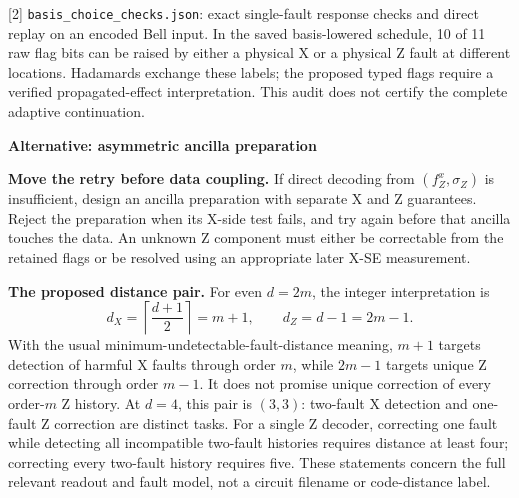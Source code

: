 \documentclass[11pt,a4paper]{article}
\begin{document}
{\footnotesize
[2] \texttt{basis\_choice\_checks.json}: exact single-fault response checks
and direct replay on an encoded Bell input. In the saved basis-lowered
schedule, 10 of 11 raw flag bits can be raised by either a physical X or a
physical Z fault at different locations. Hadamards exchange these labels;
the proposed typed flags require a verified propagated-effect interpretation.
This audit does not certify the complete adaptive continuation.
}

\clearpage
{\LARGE\bfseries Alternative: asymmetric ancilla preparation}\par

\textbf{Move the retry before data coupling.}
If direct decoding from $(f_Z^x,\sigma_Z)$ is insufficient, design an ancilla
preparation with separate X and Z guarantees. Reject the preparation when
its X-side test fails, and try again before that ancilla touches the data.
An unknown Z component must either be correctable from the retained flags
or be resolved using an appropriate later X-SE measurement.

\begin{center}
\end{center}

\textbf{The proposed distance pair.}
For even $d=2m$, the integer interpretation is
\[
 d_X=\left\lceil\frac{d+1}{2}\right\rceil=m+1,
 \qquad d_Z=d-1=2m-1.
\]
With the usual minimum-undetectable-fault-distance meaning, $m+1$ targets
detection of harmful X faults through order $m$, while $2m-1$ targets
unique Z correction through order $m-1$. It does not promise unique
correction of every order-$m$ Z history. At $d=4$, this pair is $(3,3)$:
two-fault X detection and one-fault Z correction are distinct tasks.
For a single Z decoder, correcting one fault while detecting all incompatible
two-fault histories requires distance at least four; correcting every
two-fault history requires five. These statements concern the full relevant
readout and fault model, not a circuit filename or code-distance label.
\end{document}
